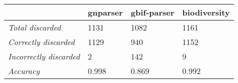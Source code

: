 \documentclass{article}
\begin{document}
    \resizebox{20cm}{!} {\begin{tabular}{| l | *{3}{l} |}
      \hline
                                     & gnparser & gbif-parser & biodiversity \\
      \hline
      \textit{Total discarded}       & 1131     & 1082        & 1161         \\
      \textit{Correctly discarded}   & 1129     & 940         & 1152         \\
      \textit{Incorrectly discarded} & 2        & 142         & 9            \\
      \textit{Accuracy}              & 0.998    & 0.869       & 0.992        \\
      \hline
    \end{tabular}
  }
\end{document}
